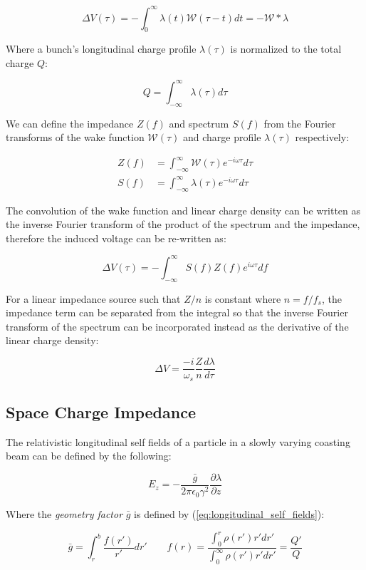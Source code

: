 $$\Delta V(\tau)=-\int_0^\infty\lambda(t)\mathcal{W}(\tau-t)dt=-\mathcal{W}*\lambda$$

Where a bunch's longitudinal charge profile $\lambda(\tau)$ is normalized to the total charge $Q$:

$$Q = \int_{-\infty}^\infty \lambda(\tau) d\tau$$

We can define the impedance $Z(f)$ and spectrum $S(f)$ from the Fourier transforms of the wake function $\mathcal{W}(\tau)$ and charge profile $\lambda(\tau)$ respectively:

$$\begin{aligned}
        Z(f) & =\int_{-\infty}^\infty\mathcal{W}(\tau)e^{-i\omega\tau}d\tau \\
        S(f) & =\int_{-\infty}^\infty\lambda(\tau)e^{-i\omega\tau}d\tau
    \end{aligned}$$

The convolution of the wake function and linear charge density can be written as the inverse Fourier transform of the product of the spectrum and the impedance, therefore the induced voltage can be re-written as:

$$\Delta V(\tau)=-\int_{-\infty}^\infty S(f)Z(f)e^{i\omega \tau}df$$

For a linear impedance source such that $Z/n$ is constant where $n = f/f_s$, the impedance term can be separated from the integral so that the inverse Fourier transform of the spectrum can be incorporated instead as the derivative of the linear charge density:

\begin{equation}
    \Delta V=\frac{-i}{\omega_s}\frac{Z}{n}\frac{d\lambda}{d\tau}
    \label{eq:induced_voltage}
\end{equation}

\subsection{Space Charge Impedance}

The relativistic longitudinal self fields of a particle in a slowly varying coasting beam can be defined by the following\cite{ferrario_space_2014}:

$$E_z=-\frac{\bar{g}}{2\pi\epsilon_0\gamma^2}\frac{\partial \lambda}{\partial z}$$

Where the \textit{geometry factor} $\bar{g}$ is defined by (\ref{eq:longitudinal_self_fields}):

$$\bar{g}=\int_r^b\frac{f(r')}{r'}dr'\qquad f(r)=\frac{\int_0^r\rho(r')r'dr'}{\int_0^\infty\rho(r')r'dr'}=\frac{Q'}{Q}$$

